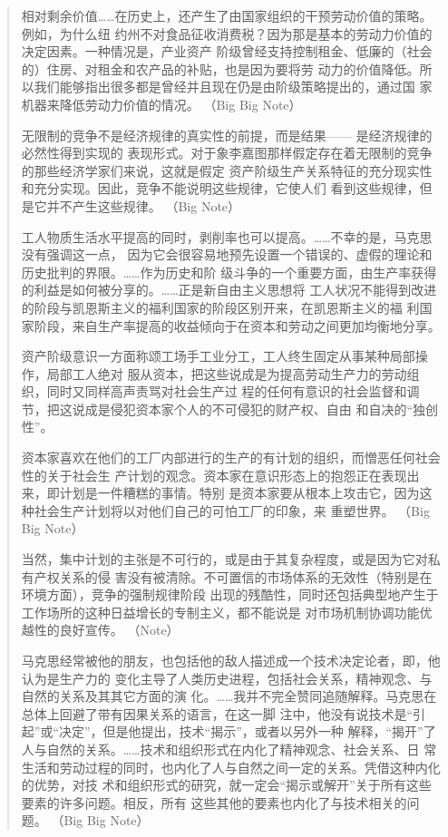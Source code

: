\begin{quotation}
相对剩余价值……在历史上，还产生了由国家组织的干预劳动价值的策略。例如，为什么纽
约州不对食品征收消费税？因为那是基本的劳动力价值的决定因素。一种情况是，产业资产
阶级曾经支持控制租金、低廉的（社会的）住房、对租金和农产品的补贴，也是因为要将劳
动力的价值降低。所以我们能够指出很多都是曾经并且现在仍是由阶级策略提出的，通过国
家机器来降低劳动力价值的情况。 （Big Big Note）

无限制的竞争不是经济规律的真实性的前提，而是结果—— 是经济规律的必然性得到实现的
表现形式。对于象李嘉图那样假定存在着无限制的竞争的那些经济学家们来说，这就是假定
资产阶级生产关系特征的充分现实性和充分实现。因此，竞争不能说明这些规律，它使人们
看到这些规律，但是它并不产生这些规律。 （Big Note）

工人物质生活水平提高的同时，剥削率也可以提高。……不幸的是，马克思没有强调这一点，
因为它会很容易地预先设置一个错误的、虚假的理论和历史批判的界限。……作为历史和阶
级斗争的一个重要方面，由生产率获得的利益是如何被分享的。……正是新自由主义思想将
工人状况不能得到改进的阶段与凯恩斯主义的福利国家的阶段区别开来，在凯恩斯主义的福
利国家阶段，来自生产率提高的收益倾向于在资本和劳动之间更加均衡地分享。

资产阶级意识一方面称颂工场手工业分工，工人终生固定从事某种局部操作，局部工人绝对
服从资本，把这些说成是为提高劳动生产力的劳动组织，同时又同样高声责骂对社会生产过
程的任何有意识的社会监督和调节，把这说成是侵犯资本家个人的不可侵犯的财产权、自由
和自决的“独创性”。

资本家喜欢在他们的工厂内部进行的生产的有计划的组织，而憎恶任何社会性的关于社会生
产计划的观念。资本家在意识形态上的抱怨正在表现出来，即计划是一件糟糕的事情。特别
是资本家要从根本上攻击它，因为这种社会生产计划将以对他们自己的可怕工厂的印象，来
重塑世界。 （Big Big Note）

当然，集中计划的主张是不可行的，或是由于其复杂程度，或是因为它对私有产权关系的侵
害没有被清除。不可置信的市场体系的无效性（特别是在环境方面），竞争的强制规律阶段
出现的残酷性，同时还包括典型地产生于工作场所的这种日益增长的专制主义，都不能说是
对市场机制协调功能优越性的良好宣传。 （Note）

马克思经常被他的朋友，也包括他的敌人描述成一个技术决定论者，即，他认为是生产力的
变化主导了人类历史进程，包括社会关系，精神观念、与自然的关系及其其它方面的演
化。……我并不完全赞同追随解释。马克思在总体上回避了带有因果关系的语言，在这一脚
注中，他没有说技术是“引起”或“决定”，但是他提出，技术“揭示”，或者以另外一种
解释，“揭开”了人与自然的关系。……技术和组织形式在内化了精神观念、社会关系、日
常生活和劳动过程的同时，也内化了人与自然之间一定的关系。凭借这种内化的优势，对技
术和组织形式的研究，就一定会“揭示或解开”关于所有这些要素的许多问题。相反，所有
这些其他的要素也内化了与技术相关的问题。
（Big Big Note）


\end{quotation}
